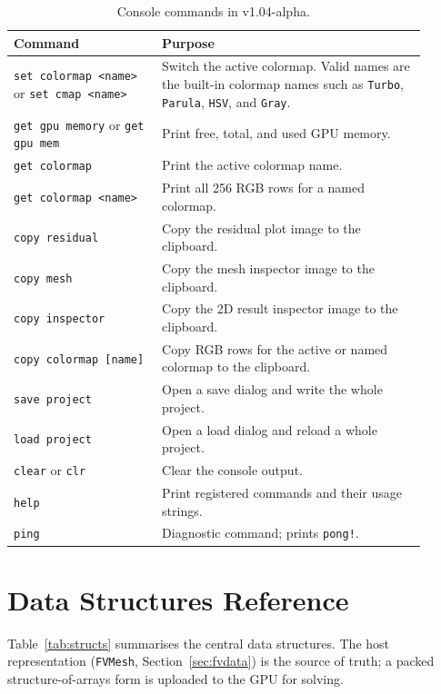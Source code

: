 \documentclass[11pt]{article}
\begin{document}
\begin{table}[h]
\centering
\caption{Console commands in v1.04-alpha.}
\label{tab:consolecmds}
\begin{tabular}{@{}>{\raggedright\arraybackslash}p{0.32\linewidth}
                   >{\raggedright\arraybackslash}p{0.58\linewidth}@{}}
\toprule
\textbf{Command} & \textbf{Purpose} \\
\midrule
\texttt{set colormap <name>} or \texttt{set cmap <name>}
  & Switch the active colormap. Valid names are the built-in colormap names such as \texttt{Turbo}, \texttt{Parula}, \texttt{HSV}, and \texttt{Gray}. \\
\texttt{get gpu memory} or \texttt{get gpu mem}
  & Print free, total, and used GPU memory. \\
\texttt{get colormap} & Print the active colormap name. \\
\texttt{get colormap <name>} & Print all 256 RGB rows for a named colormap. \\
\texttt{copy residual} & Copy the residual plot image to the clipboard. \\
\texttt{copy mesh} & Copy the mesh inspector image to the clipboard. \\
\texttt{copy inspector} & Copy the 2D result inspector image to the clipboard. \\
\texttt{copy colormap [name]} & Copy RGB rows for the active or named colormap to the clipboard. \\
\texttt{save project} & Open a save dialog and write the whole project. \\
\texttt{load project} & Open a load dialog and reload a whole project. \\
\texttt{clear} or \texttt{clr} & Clear the console output. \\
\texttt{help} & Print registered commands and their usage strings. \\
\texttt{ping} & Diagnostic command; prints \texttt{pong!}. \\
\bottomrule
\end{tabular}
\end{table}

\section{Data Structures Reference}
Table~\ref{tab:structs} summarises the central data structures. The host
representation (\texttt{FVMesh}, Section~\ref{sec:fvdata}) is the source of truth; a
packed structure-of-arrays form is uploaded to the GPU for solving.
\end{document}
